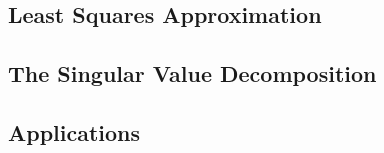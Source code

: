 \documentclass{article}
\begin{document}
    \subsection{Least Squares Approximation} 
    \begin{outline}
        \1 
    \end{outline}
    \subsection{The Singular Value Decomposition} 
    \begin{outline}
        \1 
    \end{outline}
    \subsection{Applications} 
    \begin{outline}
        \1 
    \end{outline}
    
\end{document}
